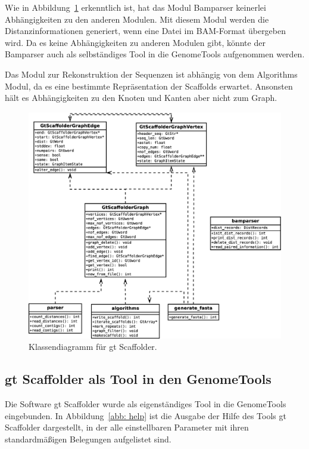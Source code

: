 \documentclass[a4paper,11pt,parskip,abstract=on]{scrartcl}
\begin{document}
Wie in Abbildung~\ref{abb: UML} erkenntlich ist, hat das Modul
Bamparser keinerlei Abhängigkeiten zu den anderen Modulen. Mit diesem
Modul werden die Distanzinformationen generiert, wenn eine Datei im
BAM-Format übergeben wird. Da es keine Abhängigkeiten zu anderen
Modulen gibt, könnte der Bamparser auch als selbständiges Tool in die
GenomeTools aufgenommen werden.

Das Modul zur Rekonstruktion der Sequenzen ist abhängig von dem
Algorithms Modul, da es eine bestimmte Repräsentation der Scaffolds
erwartet. Ansonsten hält es Abhängigkeiten zu den Knoten und Kanten
aber nicht zum Graph.

\begin{figure}
  \centering
  \includegraphics[width=1\linewidth]{uml2.eps}
  \caption{Klassendiagramm für gt Scaffolder.}
\label{abb: UML}
\end{figure}

\subsection{gt Scaffolder als Tool in den GenomeTools}
Die Software gt Scaffolder wurde als eigenständiges Tool in die GenomeTools
eingebunden. In Abbildung~\ref{abb: help} ist die Ausgabe der Hilfe des Tools
gt Scaffolder dargestellt, in der alle einstellbaren Parameter mit ihren
standardmäßigen Belegungen aufgelistet sind.
\end{document}
